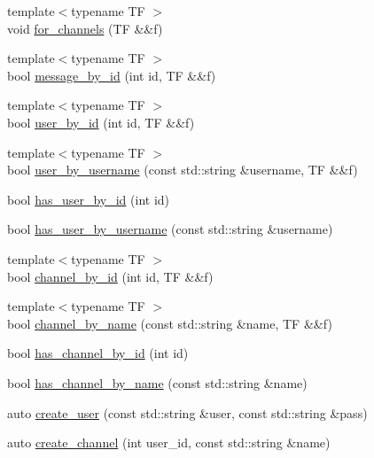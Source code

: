 \begin{DoxyCompactItemize}
\item 
{\footnotesize template$<$typename T\+F $>$ }\\void \hyperlink{namespacedb__actions_a9b636374cbe5116fcc1efee9608dc9f6}{for\+\_\+channels} (T\+F \&\&f)
\item 
{\footnotesize template$<$typename T\+F $>$ }\\bool \hyperlink{namespacedb__actions_a824939df2b60497514c935e79f0ad7c3}{message\+\_\+by\+\_\+id} (int id, T\+F \&\&f)
\item 
{\footnotesize template$<$typename T\+F $>$ }\\bool \hyperlink{namespacedb__actions_a370b23cf8e2cc650c8a9e60eee1d9aa1}{user\+\_\+by\+\_\+id} (int id, T\+F \&\&f)
\item 
{\footnotesize template$<$typename T\+F $>$ }\\bool \hyperlink{namespacedb__actions_a2fece3bf2fac3c362d7901a9e81d993e}{user\+\_\+by\+\_\+username} (const std\+::string \&username, T\+F \&\&f)
\item 
bool \hyperlink{namespacedb__actions_a400a2caa8f65cd54fa0fcb375bdecbf2}{has\+\_\+user\+\_\+by\+\_\+id} (int id)
\item 
bool \hyperlink{namespacedb__actions_aba19c40b046ef3f3aaa019b17e1c5bab}{has\+\_\+user\+\_\+by\+\_\+username} (const std\+::string \&username)
\item 
{\footnotesize template$<$typename T\+F $>$ }\\bool \hyperlink{namespacedb__actions_a55faadfd512659fa53981137fb9b77e2}{channel\+\_\+by\+\_\+id} (int id, T\+F \&\&f)
\item 
{\footnotesize template$<$typename T\+F $>$ }\\bool \hyperlink{namespacedb__actions_a5f0dc52c0af031bb2b7d908bcb535ff0}{channel\+\_\+by\+\_\+name} (const std\+::string \&name, T\+F \&\&f)
\item 
bool \hyperlink{namespacedb__actions_aae5f18f38a517aee999bb89c33a40b35}{has\+\_\+channel\+\_\+by\+\_\+id} (int id)
\item 
bool \hyperlink{namespacedb__actions_a8a4ac9753b7e3e341c460c4d03e9ead3}{has\+\_\+channel\+\_\+by\+\_\+name} (const std\+::string \&name)
\item 
auto \hyperlink{namespacedb__actions_a1140fa2d83a925887d84af7dd1d3f48c}{create\+\_\+user} (const std\+::string \&user, const std\+::string \&pass)
\item 
auto \hyperlink{namespacedb__actions_af5ccc00e3ef7a4107fab34e9e0ac9dca}{create\+\_\+channel} (int user\+\_\+id, const std\+::string \&name)

\end{DoxyCompactItemize}
